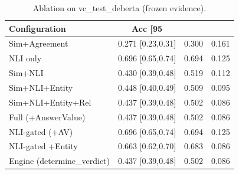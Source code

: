 \begin{table}[t]
\centering
\caption{Ablation on vc_test_deberta (frozen evidence).}
\label{tab:ablation_vc_test_deberta}
\small
\begin{tabular}{lccc}
\hline
Configuration & Acc [95\\%
\hline
Sim+Agreement & 0.271 [0.23,0.31] & 0.300 & 0.161 \\
NLI only & 0.696 [0.65,0.74] & 0.694 & 0.125 \\
Sim+NLI & 0.430 [0.39,0.48] & 0.519 & 0.112 \\
Sim+NLI+Entity & 0.448 [0.40,0.49] & 0.509 & 0.095 \\
Sim+NLI+Entity+Rel & 0.437 [0.39,0.48] & 0.502 & 0.086 \\
Full (+AnswerValue) & 0.437 [0.39,0.48] & 0.502 & 0.086 \\
NLI-gated (+AV) & 0.696 [0.65,0.74] & 0.694 & 0.125 \\
NLI-gated +Entity & 0.663 [0.62,0.70] & 0.683 & 0.086 \\
Engine (determine\_verdict) & 0.437 [0.39,0.48] & 0.502 & 0.086 \\
\hline
\end{tabular}
\end{table}